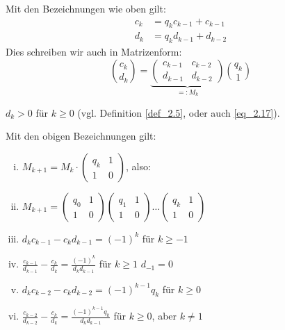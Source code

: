 \begin{falko} \label{F2.6}
	Mit den Bezeichnungen wie oben gilt:
	\begin{equation}
	\begin{aligned}
		c_k &= q_k c_{k-1} + c_{k-1} \\	\label{eq_2.17}
		d_k &= q_k d_{k-1} + d_{k-2}
	\end{aligned}
	\end{equation}
	Dies schreiben wir auch in Matrizenform:
	\begin{equation}
		\binom{c_k}{d_k} = \underbrace{\begin{pmatrix}
		c_{k-1} & c_{k-2} \\ 
		d_{k-1} & d_{k-2}
		\end{pmatrix}}_{=:M_k} \binom{q_k}{1}
	\end{equation}
\end{falko}

	$d_k > 0$ für $k \geq 0$ (vgl. Definition \ref{def_2.5}, oder auch \eqref{eq_2.17}).
	
\begin{falko} \label{F2.7}
	Mit den obigen Bezeichnungen gilt: 
	\begin{enumerate}[(i)]
		\item $M_{k+1} = M_k \cdot \begin{pmatrix}
			q_k & 1 \\ 1 & 0 
		\end{pmatrix}$, also:
		\item $M_{k+1} = \begin{pmatrix} q_0 & 1 \\ 1 & 0 \end{pmatrix} \begin{pmatrix} q_1 & 1 \\ 1 & 0 \end{pmatrix} \dots \begin{pmatrix} q_k & 1 \\ 1 & 0 \end{pmatrix}$
		\item $d_kc_{k-1} - c_kd_{k-1} = (-1)^k$ für $k \geq -1$
		\item $\frac{c_{k-1}}{d_{k-1}} - \frac{c_k}{d_k} = \frac{(-1)^k}{d_k d_{k-1}}$ für $k \geq 1$ \hfill $d_{-1} = 0$
		\item $d_kc_{k-2} - c_kd_{k-2} = (-1)^{k-1} q_k$ für $k \geq 0$
		\item $\frac{c_{k-2}}{d_{k-2}} - \frac{c_k}{d_k} = \frac{(-1)^{k-1} q_k}{d_k d_{k-1}}$ für $k \geq 0$, aber $k \neq 1$
	\end{enumerate}
\end{falko}

